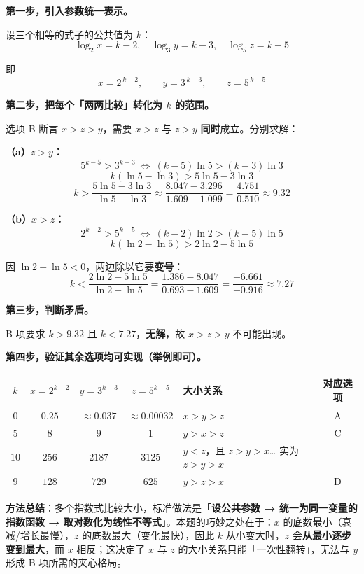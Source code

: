 \textbf{第一步，引入参数统一表示。}

设三个相等的式子的公共值为 $k$：
\[\log_2x=k-2,\quad \log_3y=k-3,\quad \log_5z=k-5\]

即
\[x=2^{\,k-2},\qquad y=3^{\,k-3},\qquad z=5^{\,k-5}\]

\textbf{第二步，把每个「两两比较」转化为 $k$ 的范围。}

选项 B 断言 $x>z>y$，需要 $x>z$ 与 $z>y$ \textbf{同时}成立。分别求解：

\textbf{（a）$z>y$：}
\[5^{k-5}>3^{k-3}\ \Longleftrightarrow\ (k-5)\ln5>(k-3)\ln3\]
\[k(\ln5-\ln3)>5\ln5-3\ln3\]
\[k>\frac{5\ln5-3\ln3}{\ln5-\ln3}\approx\frac{8.047-3.296}{1.609-1.099}=\frac{4.751}{0.510}\approx9.32\]

\textbf{（b）$x>z$：}
\[2^{k-2}>5^{k-5}\ \Longleftrightarrow\ (k-2)\ln2>(k-5)\ln5\]
\[k(\ln2-\ln5)>2\ln2-5\ln5\]

因 $\ln2-\ln5<0$，两边除以它要\textbf{变号}：
\[k<\frac{2\ln2-5\ln5}{\ln2-\ln5}=\frac{1.386-8.047}{0.693-1.609}=\frac{-6.661}{-0.916}\approx7.27\]

\textbf{第三步，判断矛盾。}

B 项要求 $k>9.32$ 且 $k<7.27$，\textbf{无解}，故 $x>z>y$ 不可能出现。

\textbf{第四步，验证其余选项均可实现（举例即可）。}

\begin{center}
\begin{tabular}{cccclc}
\toprule
$k$ & $x=2^{k-2}$ & $y=3^{k-3}$ & $z=5^{k-5}$ & 大小关系 & 对应选项 \\
\midrule
$0$ & $0.25$ & $\approx0.037$ & $\approx0.00032$ & $x>y>z$ & A  \\
$5$ & $8$ & $9$ & $1$ & $y>x>z$ & C  \\
$10$ & $256$ & $2187$ & $3125$ & $y<z$，且 $z>y>x$… 实为 $z>y>x$ & — \\
$9$ & $128$ & $729$ & $625$ & $y>z>x$ & D  \\
\bottomrule
\end{tabular}
\end{center}


\begin{gktip}
\textbf{方法总结}：多个指数式比较大小，标准做法是「\textbf{设公共参数 → 统一为同一变量的指数函数 → 取对数化为线性不等式}」。本题的巧妙之处在于：$x$ 的底数最小（衰减/增长最慢），$z$ 的底数最大（变化最快），因此 $k$ 从小变大时，$z$ 会\textbf{从最小逐步变到最大}，而 $x$ 相反；这决定了 $x$ 与 $z$ 的大小关系只能「一次性翻转」，无法与 $y$ 形成 B 项所需的夹心格局。
\end{gktip}

